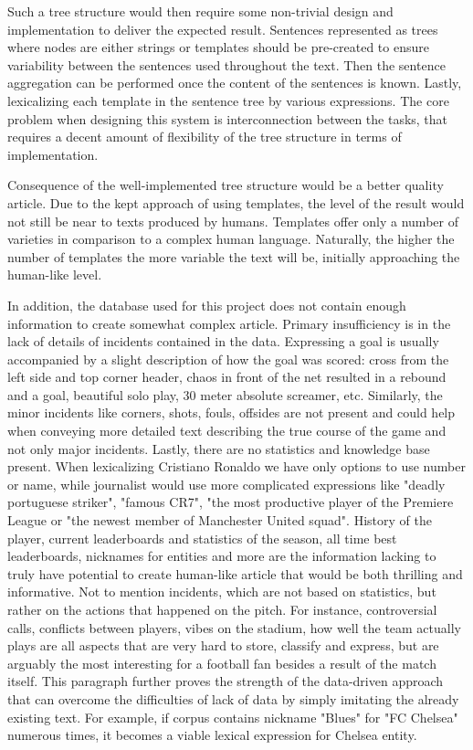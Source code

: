 Such a tree structure would then require some non-trivial design and implementation to deliver the expected result. Sentences represented as trees where nodes are either strings or templates should be pre-created  to ensure variability between the sentences used throughout the text. Then the sentence aggregation can be performed once the content of the sentences is known. Lastly, lexicalizing each template in the sentence tree by various expressions. The core problem when designing this system is interconnection between the tasks, that requires a decent amount of flexibility of the tree structure in terms of implementation.  

Consequence of the well-implemented tree structure would be a better quality article. Due to the kept approach of using templates, the level of the result would not still be near to texts produced by humans. Templates offer only a number of varieties in comparison to a complex human language. Naturally, the higher the number of templates the more variable the text will be, initially approaching the human-like level. 

In addition, the database used for this project does not contain enough information to create somewhat complex article. Primary insufficiency is in the lack of details of incidents contained in the data. Expressing a goal is usually accompanied by a slight description of how the goal was scored: cross from the left side and top corner header, chaos in front of the net resulted in a rebound and a goal, beautiful solo play, 30 meter absolute screamer, etc. Similarly, the minor incidents like corners, shots, fouls, offsides are not present and could help when conveying more detailed text describing the true course of the game and not only major incidents. Lastly, there are no statistics and knowledge base present. When lexicalizing Cristiano Ronaldo we have only options to use number or name, while journalist would use more complicated expressions like "deadly portuguese striker", "famous CR7", "the most productive player of the Premiere League or "the newest member of Manchester United squad". History of the player, current leaderboards and statistics of the season, all time best leaderboards, nicknames for entities and more are the information lacking to truly have potential to create human-like article that would be both thrilling and informative. Not to mention incidents, which are not based on statistics, but rather on the actions that happened on the pitch. For instance, controversial calls, conflicts between players, vibes on the stadium, how well the team actually plays are all aspects that are very hard to store, classify and express, but are arguably the most interesting for a football fan besides a result of the match itself. This paragraph further proves the strength of the data-driven approach that can overcome the difficulties of lack of data by simply imitating the already existing text. For example, if corpus contains nickname "Blues" for "FC Chelsea" numerous times, it becomes a viable lexical expression for Chelsea entity.

